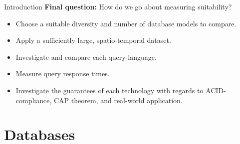 \begin{frame}{Introduction}
    \textbf{Final question:} How do we go about measuring suitability?
    \vfill
    \begin{itemize}
        \item Choose a suitable diversity and number of database models to compare.
        \item Apply a sufficiently large, spatio-temporal dataset.
        \item Investigate and compare each query language.
        \item Measure query response times.
        \item Investigate the guarantees of each technology with regards to ACID-compliance, CAP theorem, and real-world application.
    \end{itemize}
\end{frame}

\section{Databases}

